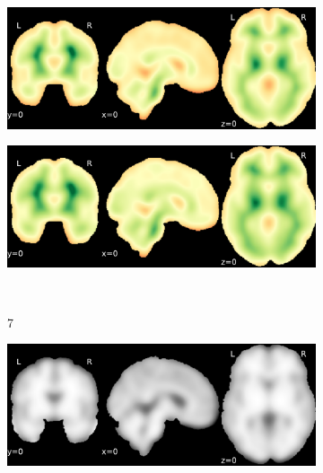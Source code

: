 \documentclass{article}
\begin{document}
\begin{appendices}
\begin{landscape}
\begin{figure}
\begin{subfigure}[t]{0.2\paperheight}
            \end{subfigure}
            \begin{subfigure}[t]{0.2\paperheight}
                \centering
                \includegraphics[width=\textwidth]{figures/sig/15mm/rs_ds001748_sub-adult16_sig.pdf}
            \end{subfigure}
            \begin{subfigure}[t]{0.2\paperheight}
                \centering
                \includegraphics[width=\textwidth]{figures/sig/15mm/rr.rs_ds001748_sub-adult16_sig.pdf}
            \end{subfigure} \\
            \begin{subfigure}[b][][c]{0.01\paperwidth} 7 \vspace*{15pt} \end{subfigure}
            \begin{subfigure}[t]{0.2\paperheight}
                \centering
                \includegraphics[width=\textwidth]{figures/sig/15mm/ieee_ds002338_sub-xp201.pdf}

\end{subfigure}
\end{figure}
\end{landscape}
\end{appendices}
\end{document}
